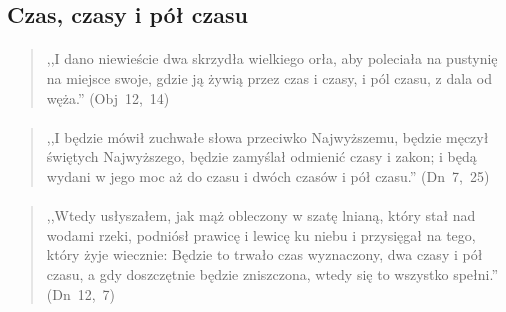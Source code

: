 \documentclass[10pt,a4paper,oneside]{article}
\begin{document}
\subsection{Czas, czasy i pół czasu}
\paragraph{}
\begin{quote}
,,I dano niewieście dwa skrzydła wielkiego orła, aby poleciała na pustynię na miejsce swoje, gdzie ją żywią przez czas i czasy, i pól czasu, z dala od węża.'' \mbox{(Obj 12, 14)}
\end{quote}
\paragraph{}
\begin{quote}
,,I będzie mówił zuchwałe słowa przeciwko Najwyższemu, będzie męczył świętych Najwyższego, będzie zamyślał odmienić czasy i zakon; i będą wydani w jego moc aż do czasu i dwóch czasów i pół czasu.'' \mbox{(Dn 7, 25)}
\end{quote}
\paragraph{}
\begin{quote}
,,Wtedy usłyszałem, jak mąż obleczony w szatę lnianą, który stał nad wodami rzeki, podniósł prawicę i lewicę ku niebu i przysięgał na tego, który żyje wiecznie: Będzie to trwało czas wyznaczony, dwa czasy i pół czasu, a gdy doszczętnie będzie zniszczona, wtedy się to wszystko spełni.'' \mbox{(Dn 12, 7)}
\end{quote}
\end{document}
